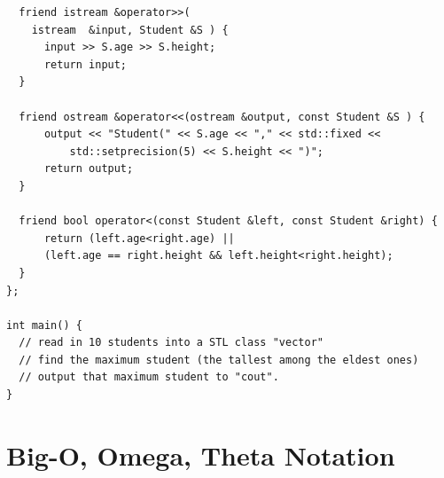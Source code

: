 \documentclass[a4paper,12pt]{article}
\begin{document}
\begin{enumerate}[label=2.\Alph*.]
\begin{verbatim}
  friend istream &operator>>(
    istream  &input, Student &S ) { 
      input >> S.age >> S.height;
      return input;            
  }

  friend ostream &operator<<(ostream &output, const Student &S ) { 
      output << "Student(" << S.age << "," << std::fixed << 
          std::setprecision(5) << S.height << ")";
      return output;            
  }

  friend bool operator<(const Student &left, const Student &right) {
      return (left.age<right.age) || 
	  (left.age == right.height && left.height<right.height);
  }
};

int main() {
  // read in 10 students into a STL class "vector" 
  // find the maximum student (the tallest among the eldest ones)
  // output that maximum student to "cout". 
}
\end{verbatim}


\end{enumerate}






\section{Big-O, Omega, Theta Notation}
\end{document}
